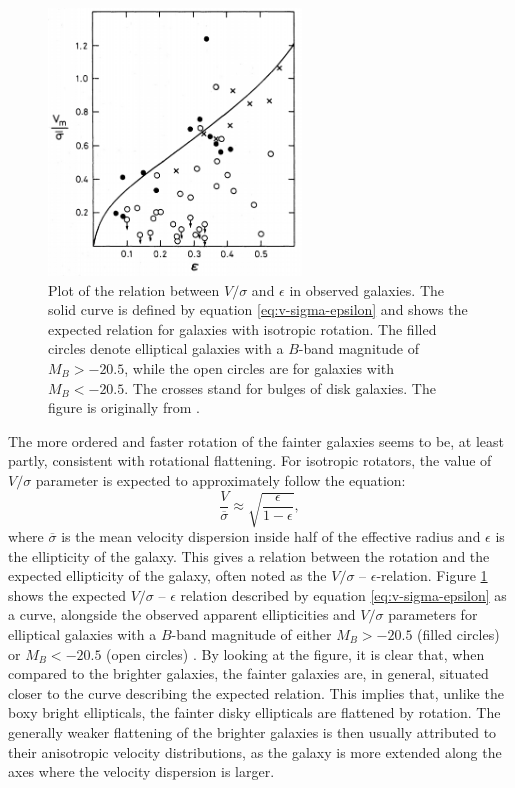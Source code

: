 \documentclass[english, twoside]{HYgradu}
\begin{document}
\begin{figure}[h]
	\centering
	\includegraphics[width=0.60\textwidth]{davies_v-sigma.png}
	\caption{Plot of the relation between $V/\sigma$ and $\epsilon$ in observed galaxies. The solid curve is defined by equation \ref{eq:v-sigma-epsilon} and shows the expected relation for galaxies with isotropic rotation. The filled circles denote elliptical galaxies with a $B$-band magnitude of $M_B > -20.5$, while the open circles are for galaxies with $M_B < -20.5$. The crosses stand for bulges of disk galaxies. The figure is originally from \cite{Davies1983}.}
	\label{figure:v-sigma}
\end{figure}

The more ordered and faster rotation of the fainter galaxies seems to be, at least partly, consistent with rotational flattening. For isotropic rotators, the value of $V/\sigma$ parameter is expected to approximately follow the equation:
\begin{equation}
\frac{V}{\overline{\sigma}} \approx \sqrt{\frac{\epsilon}{1-\epsilon}}, \label{eq:v-sigma-epsilon}
\end{equation}
where $\overline{\sigma}$ is the mean velocity dispersion inside half of the effective radius and $\epsilon$ is the ellipticity of the galaxy. This gives a relation between the rotation and the expected ellipticity of the galaxy, often noted as the $V/\sigma$ – $\epsilon$-relation. Figure \ref{figure:v-sigma} shows the expected $V/\sigma$ – $\epsilon$ relation described by equation \ref{eq:v-sigma-epsilon} as a curve, alongside the observed apparent ellipticities and $V/\sigma$ parameters for elliptical galaxies with a $B$-band magnitude of either $M_B > -20.5$ (filled circles) or $M_B < -20.5$ (open circles) \citep{Davies1983}. By looking at the figure, it is clear that, when compared to the brighter galaxies, the fainter galaxies are, in general, situated closer to the curve describing the expected relation. This implies that, unlike the boxy bright ellipticals, the fainter disky ellipticals are flattened by rotation. The generally weaker flattening of the brighter galaxies is then usually attributed to their anisotropic velocity distributions, as the galaxy is more extended along the axes where the velocity dispersion is larger.
\end{document}
